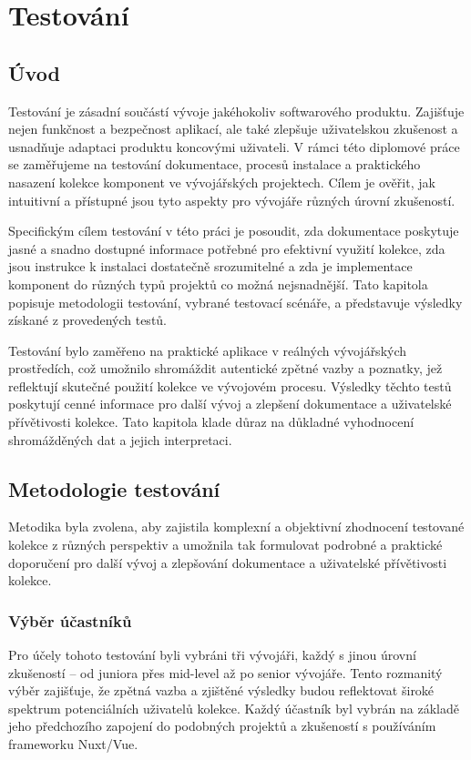 
\chapter{Testování}

\section{Úvod}
Testování je zásadní součástí vývoje jakéhokoliv softwarového produktu. Zajišťuje nejen funkčnost a bezpečnost aplikací, ale také zlepšuje uživatelskou zkušenost a usnadňuje adaptaci produktu koncovými uživateli. V rámci této diplomové práce se zaměřujeme na testování dokumentace, procesů instalace a praktického nasazení kolekce komponent ve vývojářských projektech. Cílem je ověřit, jak intuitivní a přístupné jsou tyto aspekty pro vývojáře různých úrovní zkušeností.

Specifickým cílem testování v této práci je posoudit, zda dokumentace poskytuje jasné a snadno dostupné informace potřebné pro efektivní využití kolekce, zda jsou instrukce k instalaci dostatečně srozumitelné a zda je implementace komponent do různých typů projektů co možná nejsnadnější. Tato kapitola popisuje metodologii testování, vybrané testovací scénáře, a představuje výsledky získané z provedených testů.

Testování bylo zaměřeno na praktické aplikace v reálných vývojářských prostředích, což umožnilo shromáždit autentické zpětné vazby a poznatky, jež reflektují skutečné použití kolekce ve vývojovém procesu. Výsledky těchto testů poskytují cenné informace pro další vývoj a zlepšení dokumentace a uživatelské přívětivosti kolekce. Tato kapitola klade důraz na důkladné vyhodnocení shromážděných dat a jejich interpretaci.

\section{Metodologie testování}
Metodika byla zvolena, aby zajistila komplexní a objektivní zhodnocení testované kolekce z různých perspektiv a umožnila tak formulovat podrobné a praktické doporučení pro další vývoj a zlepšování dokumentace a uživatelské přívětivosti kolekce.

\subsection{Výběr účastníků}
Pro účely tohoto testování byli vybráni tři vývojáři, každý s jinou úrovní zkušeností – od juniora přes mid-level až po senior vývojáře. Tento rozmanitý výběr zajišťuje, že zpětná vazba a zjištěné výsledky budou reflektovat široké spektrum potenciálních uživatelů kolekce. Každý účastník byl vybrán na základě jeho předchozího zapojení do podobných projektů a zkušeností s používáním frameworku Nuxt/Vue.

